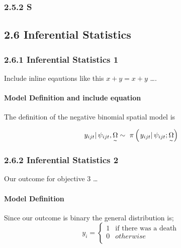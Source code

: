 \documentclass[12pt,]{article}
\let\oldparagraph\paragraph
\renewcommand{\paragraph}[1]{\oldparagraph{#1}\mbox{}}
\begin{document}
\subsubsection{2.5.2 S}\label{s}

\subsection{2.6 Inferential Statistics}\label{inferential-statistics}

\subsubsection{2.6.1 Inferential Statistics
1}\label{inferential-statistics-1}

Include inline eqautions like this \(x+y=x+y\) \ldots{}.

\paragraph{Model Definition and include
equation}\label{model-definition-and-include-equation}

The definition of the negative binomial spatial model is

\begin{equation}
\left. {{y}_{ijt}} \right|{{\psi }_{ijt}},\underset{\scriptscriptstyle\thicksim}{\Omega }\sim{\ }\pi \left( \left. {{y}_{ijt}} \right|{{\psi }_{ijt}};\underset{\scriptscriptstyle\thicksim}{\Omega } \right)
\label{eq:binom1}
\end{equation}

\subsubsection{2.6.2 Inferential Statistics
2}\label{inferential-statistics-2}

Our outcome for objective 3 \ldots{}

\paragraph{Model Definition}\label{model-definition}

Since our outcome is binary the general distribution is; \[
{{y}_{i}}=\left\{ \begin{matrix}
   1  \\
   0  \\
\end{matrix} \right.\begin{matrix}
   \text{if there was a death}  \\
   otherwise  \\
\end{matrix}
\]
\end{document}
